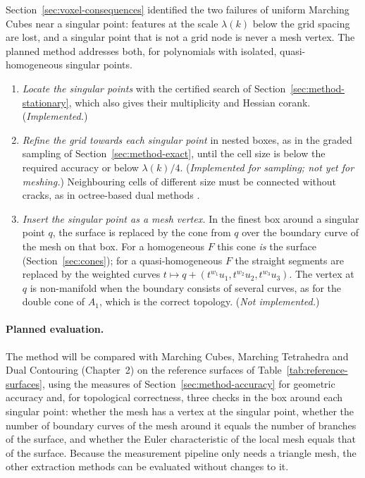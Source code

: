 Section~\ref{sec:voxel-consequences} identified the two failures of uniform
Marching Cubes near a singular point: features at the scale $\lambda(k)$ below
the grid spacing are lost, and a singular point that is not a grid node is
never a mesh vertex. The planned method addresses both, for polynomials with
isolated, quasi-homogeneous singular points.
\begin{enumerate}
    \item \emph{Locate the singular points} with the certified search of
          Section~\ref{sec:method-stationary}, which also gives their
          multiplicity and Hessian corank. (\emph{Implemented.})
    \item \emph{Refine the grid towards each singular point} in nested boxes,
          as in the graded sampling of Section~\ref{sec:method-exact}, until the
          cell size is below the required accuracy or below
          $\lambda(k)/4$. (\emph{Implemented for sampling; not yet for meshing.})
          Neighbouring cells of different size must be connected without
          cracks, as in octree-based dual methods \cite{ju2002dual}.
    \item \emph{Insert the singular point as a mesh vertex.} In the finest
          box around a singular point $q$, the surface is replaced by the cone
          from $q$ over the boundary curve of the mesh on that box. For a
          homogeneous $F$ this cone \emph{is} the surface
          (Section~\ref{sec:cones}); for a quasi-homogeneous $F$ the straight
          segments are replaced by the weighted curves
          $t\mapsto q+(t^{w_1}u_1,t^{w_2}u_2,t^{w_3}u_3)$. The vertex at $q$ is
          non-manifold when the boundary consists of several curves, as for the
          double cone of $A_1$, which is the correct topology.
          (\emph{Not implemented.})
\end{enumerate}

\paragraph{Planned evaluation.} The method will be compared with Marching
Cubes, Marching Tetrahedra and Dual Contouring (Chapter~2) on the reference
surfaces of Table~\ref{tab:reference-surfaces}, using the measures of
Section~\ref{sec:method-accuracy} for geometric accuracy and, for topological
correctness, three checks in the box around each singular point: whether the
mesh has a vertex at the singular point, whether the number of boundary curves
of the mesh around it equals the number of branches of the surface, and
whether the Euler characteristic of the local mesh equals that of the surface.
Because the measurement pipeline only needs a triangle mesh, the other
extraction methods can be evaluated without changes to it.
